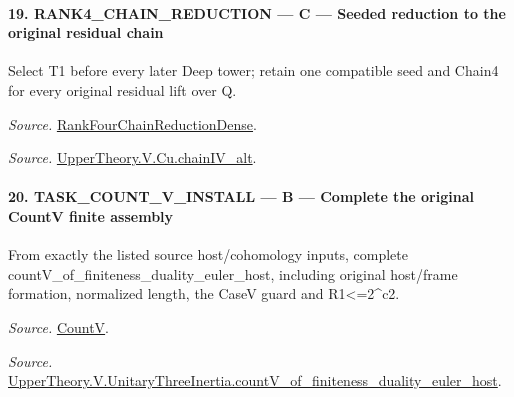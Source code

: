 \paragraph{19. RANK4\_\allowbreak CHAIN\_\allowbreak REDUCTION — C — Seeded reduction to the original residual chain}

Select T1 before every later Deep tower; retain one compatible seed and Chain4 for every original residual lift over Q.

\emph{Source.} \href{https://github.com/CocoSgt/riemann-hypothesis-lean/blob/7cbf7a0c32fca1badf05931879a37c3f8a2b03b4/src/Development/AutomorphicArithmetic/AutomorphicVarieties/ModularityArgument/ThresholdArguments/DenseThresholdCases/PromodularityCaseThree.lean#L33-L39}{RankFourChainReductionDense}.

\emph{Source.} \href{https://github.com/CocoSgt/riemann-hypothesis-lean/blob/7cbf7a0c32fca1badf05931879a37c3f8a2b03b4/src/Development/AutomorphicArithmetic/AutomorphicVarieties/ModularityArgument/ThresholdArguments/DenseThresholdCases/CuPChainIV.lean#L16-L82}{UpperTheory.V.Cu.chainIV\_\allowbreak alt}.



\paragraph{20. TASK\_\allowbreak COUNT\_\allowbreak V\_\allowbreak INSTALL — B — Complete the original CountV finite assembly}

From exactly the listed source host/cohomology inputs, complete countV\_\allowbreak of\_\allowbreak finiteness\_\allowbreak duality\_\allowbreak euler\_\allowbreak host, including original host/frame formation, normalized length, the CaseV guard and R1<=2\textasciicircum{}c2.

\emph{Source.} \href{https://github.com/CocoSgt/riemann-hypothesis-lean/blob/7cbf7a0c32fca1badf05931879a37c3f8a2b03b4/src/Development/AutomorphicArithmetic/AutomorphicVarieties/HeightAndVanishing/Counts.lean#L69-L69}{CountV}.

\emph{Source.} \href{https://github.com/CocoSgt/riemann-hypothesis-lean/blob/7cbf7a0c32fca1badf05931879a37c3f8a2b03b4/src/Development/AutomorphicArithmetic/AutomorphicVarieties/ModularityArgument/ThresholdArguments/DenseThresholdCases/CountVOf.lean#L33-L60}{UpperTheory.V.UnitaryThreeInertia.countV\_\allowbreak of\_\allowbreak finiteness\_\allowbreak duality\_\allowbreak euler\_\allowbreak host}.



